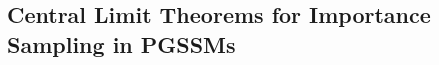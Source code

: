 %
%
%


\subsection{Central Limit Theorems for Importance Sampling in PGSSMs}
\label{subsec:clt_pgssms}

